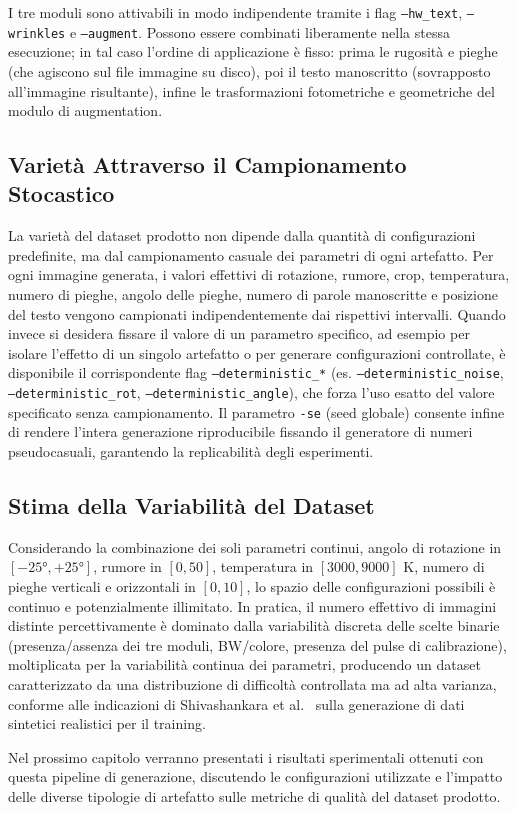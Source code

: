 I tre moduli sono attivabili in modo indipendente tramite i flag \texttt{--hw\_text}, \texttt{--wrinkles} e \texttt{--augment}. Possono essere combinati liberamente nella stessa esecuzione; in tal caso l'ordine di applicazione è fisso: prima le rugosità e pieghe (che agiscono sul file immagine su disco), poi il testo manoscritto (sovrapposto all'immagine risultante), infine le trasformazioni fotometriche e geometriche del modulo di augmentation.

\subsection{Varietà Attraverso il Campionamento Stocastico}

La varietà del dataset prodotto non dipende dalla quantità di configurazioni predefinite, ma dal campionamento casuale dei parametri di ogni artefatto. Per ogni immagine generata, i valori effettivi di rotazione, rumore, crop, temperatura, numero di pieghe, angolo delle pieghe, numero di parole manoscritte e posizione del testo vengono campionati indipendentemente dai rispettivi intervalli. Quando invece si desidera fissare il valore di un parametro specifico, ad esempio per isolare l'effetto di un singolo artefatto o per generare configurazioni controllate, è disponibile il corrispondente flag \texttt{--deterministic\_*} (es. \texttt{--deterministic\_noise}, \texttt{--deterministic\_rot}, \texttt{--deterministic\_angle}), che forza l'uso esatto del valore specificato senza campionamento. Il parametro \texttt{-se} (seed globale) consente infine di rendere l'intera generazione riproducibile fissando il generatore di numeri pseudocasuali, garantendo la replicabilità degli esperimenti.

\subsection{Stima della Variabilità del Dataset}

Considerando la combinazione dei soli parametri continui, angolo di rotazione in $[-25°, +25°]$, rumore in $[0, 50]$, temperatura in $[3000, 9000]$ K, numero di pieghe verticali e orizzontali in $[0, 10]$, lo spazio delle configurazioni possibili è continuo e potenzialmente illimitato. In pratica, il numero effettivo di immagini distinte percettivamente è dominato dalla variabilità discreta delle scelte binarie (presenza/assenza dei tre moduli, BW/colore, presenza del pulse di calibrazione), moltiplicata per la variabilità continua dei parametri, producendo un dataset caratterizzato da una distribuzione di difficoltà controllata ma ad alta varianza, conforme alle indicazioni di Shivashankara et al.~\cite{ecgimagekitpaper} sulla generazione di dati sintetici realistici per il training.

\vspace{4mm}
Nel prossimo capitolo verranno presentati i risultati sperimentali ottenuti con questa pipeline di generazione, discutendo le configurazioni utilizzate e l'impatto delle diverse tipologie di artefatto sulle metriche di qualità del dataset prodotto.